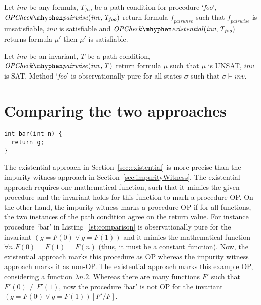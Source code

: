 \documentclass{llncs}
\newcommand{\foo}{\textit{foo}}
\newcommand{\inv}{\mathit{inv}}
\newcommand{\pathCondition}{\mathit{T_{\foo}}}
\newcommand{\OPCheckE}{\mathit{OPCheck \mhyphen existential}}
\newcommand{\OPCheckA}{\mathit{OPCheck \mhyphen pairwise}}
\newcommand{\mi}[1]{\mathit{#1}}
\newcommand{\F}{\mathit{F}}
\newcommand{\satisfies}{\vdash}
\newcommand{\formula}{\mu}
\newcommand{\pairFormula}{\mathit{f_{pairwise}}}
\newcommand{\state}{\sigma}
\begin{document}
\begin{lemma} \label{lemma:pairwise}
  Let $\inv$ be any formula, $\pathCondition$ be a path condition for
  procedure `\foo', \\$\OPCheckA \mi{(\inv, \pathCondition)}$ return
  formula $\pairFormula$ such that $\pairFormula$ is
  unsatisfiable, $\inv$ is satisfiable and $\OPCheckE \mi{(\inv,
    \pathCondition)}$ returns formula $\formula'$ then $\formula'$ is
  satisfiable.
\end{lemma}

\begin{theorem} \label{theorem:impurityWitness}
  Let $\inv$ be an invariant, $T$ be a path condition,
  $\OPCheckA \mi{(\inv, T)}$ return formula $\formula$ such that
  $\formula$ is UNSAT, $\inv$ is SAT. Method `\foo' is
  observationally pure for all states $\state$ such that $\state
  \satisfies \inv$.
\end{theorem}

\section{Comparing the two approaches}

\begin{lstlisting}[caption={Procedure `bar': illustrates that
      existential approach is more precise that the impurity witness
      approach.}, label=lst:comparison]
int bar(int n) { 
  return g; 
}
\end{lstlisting}

The existential approach in Section~\ref{sec:existential} is more
precise than the impurity witness approach in
Section~\ref{sec:impurityWitness}. The existential approach requires
one mathematical function, such that it mimics the given procedure and
the invariant holds for this function to mark a procedure OP. On the
other hand, the impurity witness marks a procedure OP if for all
functions, the two instances of the path condition agree on the return
value. For instance procedure `bar' in Listing~\ref{lst:comparison} is
observationally pure for the invariant $(g = \F(0) \vee g = \F(1))$
and it mimics the mathematical function $\forall n. \F(0) = \F(1) =
\F(n)$ (thus, it must be a constant function). Now, the existential
approach marks this procedure as OP whereas the impurity witness
approach marks it as non-OP. The existential approach marks this
example OP, considering a function $\lambda n. 2$. Whereas there are
many functions $\F'$ such that $\F'(0) \neq \F'(1)$, now the procedure
`bar' is not OP for the invariant $(g = \F(0) \vee g = \F(1))[\F'/\F]$.
\end{document}
